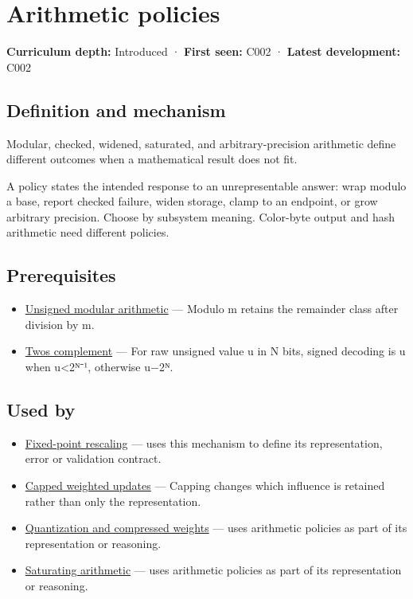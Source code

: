\hypertarget{appendix-2ed044358b82}{}\label{referencestart:appendix-2ed044358b82}
\section{Arithmetic policies}\label{appendix-2ed044358b82-arithmetic-policies}

\textbf{Curriculum depth:} Introduced · \textbf{First seen:} C002 · \textbf{Latest development:} C002

\subsection{Definition and mechanism}\label{appendix-2ed044358b82-definition-and-mechanism}

Modular, checked, widened, saturated, and arbitrary-precision arithmetic define different outcomes when a mathematical result does not fit.

A policy states the intended response to an unrepresentable answer: wrap modulo a base, report checked failure, widen storage, clamp to an endpoint, or grow arbitrary precision. Choose by subsystem meaning. Color-byte output and hash arithmetic need different policies.

\subsection{Prerequisites}\label{appendix-2ed044358b82-prerequisites}

\begin{itemize}
\tightlist
\item
  \hyperref[appendix-c99977d88b33]{Unsigned modular arithmetic} --- Modulo m retains the remainder class after division by m.
\item
  \hyperref[appendix-4fbc03d20829]{Two\textquotesingle s complement} --- For raw unsigned value u in N bits, signed decoding is u when u\textless2ᴺ⁻¹, otherwise u−2ᴺ.
\end{itemize}

\subsection{Used by}\label{appendix-2ed044358b82-used-by}

\begin{itemize}
\item
  \hyperref[appendix-3333db47830f]{Fixed-point rescaling} --- uses this mechanism to define its representation, error or validation contract.
\item
  \hyperref[appendix-1e45d0613db3]{Capped weighted updates} --- Capping changes which influence is retained rather than only the representation.
\item
  \hyperref[appendix-fdc7879e8bf2]{Quantization and compressed weights} --- uses arithmetic policies as part of its representation or reasoning.
\item
  \hyperref[appendix-3999c6209649]{Saturating arithmetic} --- uses arithmetic policies as part of its representation or reasoning.
\end{itemize}

